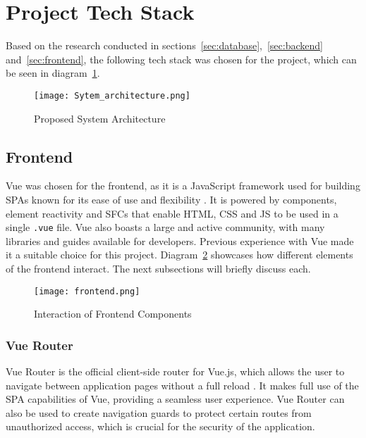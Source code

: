 \section{Project Tech Stack}\label{sec:techstack}

Based on the research conducted in sections~\ref{sec:database},~\ref{sec:backend} and~\ref{sec:frontend}, the following tech stack was chosen for the project, which can be seen in diagram~\ref{fig:architecture}.

\begin{figure}[htbp]
    \centering
    \texttt{[image: Sytem\_architecture.png]}
    \caption{Proposed System Architecture}\label{fig:architecture}
\end{figure}

\subsection{Frontend}

Vue was chosen for the frontend, as it is a JavaScript framework used for building SPAs known for its ease of use and flexibility \parencite{vue}. It is powered by components, element reactivity and SFCs that enable HTML, CSS and JS to be used in a single \lstinline{.vue} file. Vue also boasts a large and active community, with many libraries and guides available for developers. Previous experience with Vue made it a suitable choice for this project. Diagram~\ref{fig:frontend} showcases how different elements of the frontend interact. The next subsections will briefly discuss each.

\begin{figure}[htbp]
    \centering
    \texttt{[image: frontend.png]}
    \caption{Interaction of Frontend Components}\label{fig:frontend}
\end{figure}

\FloatBarrier{}
\subsubsection{Vue Router}

Vue Router is the official client-side router for Vue.js, which allows the user to navigate between application pages without a full reload \parencite{vuerouter}. It makes full use of the SPA capabilities of Vue, providing a seamless user experience. Vue Router can also be used to create navigation guards to protect certain routes from unauthorized access, which is crucial for the security of the application.

